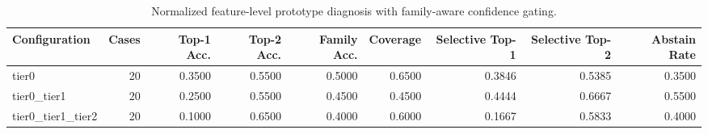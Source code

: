 \begin{table}[t]
\centering
\caption{Normalized feature-level prototype diagnosis with family-aware confidence gating.}
\label{tab:dice_stressor_hierarchical_diagnosis}
\footnotesize
\begin{tabular}{lrrrrrrrr}
\toprule
Configuration & Cases & Top-1 Acc. & Top-2 Acc. & Family Acc. & Coverage & Selective Top-1 & Selective Top-2 & Abstain Rate \\
\midrule
tier0 & 20 & 0.3500 & 0.5500 & 0.5000 & 0.6500 & 0.3846 & 0.5385 & 0.3500 \\
tier0_tier1 & 20 & 0.2500 & 0.5500 & 0.4500 & 0.4500 & 0.4444 & 0.6667 & 0.5500 \\
tier0_tier1_tier2 & 20 & 0.1000 & 0.6500 & 0.4000 & 0.6000 & 0.1667 & 0.5833 & 0.4000 \\
\bottomrule
\end{tabular}

\end{table}
